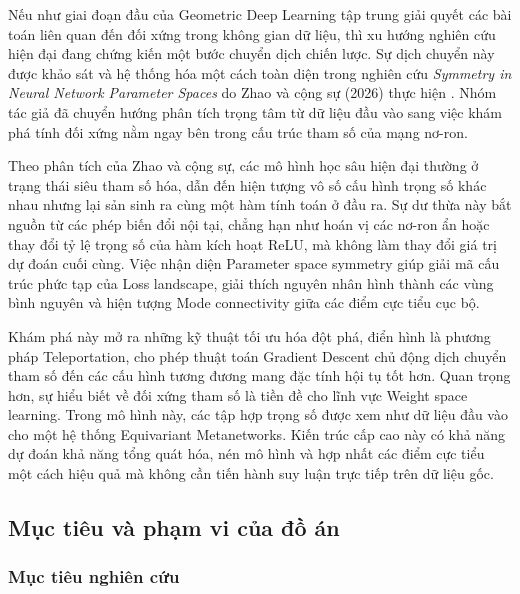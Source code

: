 Nếu như giai đoạn đầu của Geometric Deep Learning tập trung giải quyết các bài toán liên quan đến đối xứng trong không gian dữ liệu, thì xu hướng nghiên cứu hiện đại đang chứng kiến một bước chuyển dịch chiến lược. Sự dịch chuyển này được khảo sát và hệ thống hóa một cách toàn diện trong nghiên cứu \textit{Symmetry in Neural Network Parameter Spaces} do Zhao và cộng sự (2026) thực hiện \cite{zhao2026symmetry}. Nhóm tác giả đã chuyển hướng phân tích trọng tâm từ dữ liệu đầu vào sang việc khám phá tính đối xứng nằm ngay bên trong cấu trúc tham số của mạng nơ-ron.

Theo phân tích của Zhao và cộng sự, các mô hình học sâu hiện đại thường ở trạng thái siêu tham số hóa, dẫn đến hiện tượng vô số cấu hình trọng số khác nhau nhưng lại sản sinh ra cùng một hàm tính toán ở đầu ra. Sự dư thừa này bắt nguồn từ các phép biến đổi nội tại, chẳng hạn như hoán vị các nơ-ron ẩn hoặc thay đổi tỷ lệ trọng số của hàm kích hoạt ReLU, mà không làm thay đổi giá trị dự đoán cuối cùng. Việc nhận diện Parameter space symmetry giúp giải mã cấu trúc phức tạp của Loss landscape, giải thích nguyên nhân hình thành các vùng bình nguyên và hiện tượng Mode connectivity giữa các điểm cực tiểu cục bộ.

\begin{morong}
Khám phá này mở ra những kỹ thuật tối ưu hóa đột phá, điển hình là phương pháp Teleportation, cho phép thuật toán Gradient Descent chủ động dịch chuyển tham số đến các cấu hình tương đương mang đặc tính hội tụ tốt hơn. Quan trọng hơn, sự hiểu biết về đối xứng tham số là tiền đề cho lĩnh vực Weight space learning. Trong mô hình này, các tập hợp trọng số được xem như dữ liệu đầu vào cho một hệ thống Equivariant Metanetworks. Kiến trúc cấp cao này có khả năng dự đoán khả năng tổng quát hóa, nén mô hình và hợp nhất các điểm cực tiểu một cách hiệu quả mà không cần tiến hành suy luận trực tiếp trên dữ liệu gốc.
\end{morong}

\subsection{Mục tiêu và phạm vi của đồ án}
\label{subsec:muc-tieu-va-pham-vi}

\subsubsection{Mục tiêu nghiên cứu}
\label{subsubsec:muc-tieu-nghien-cuu}

